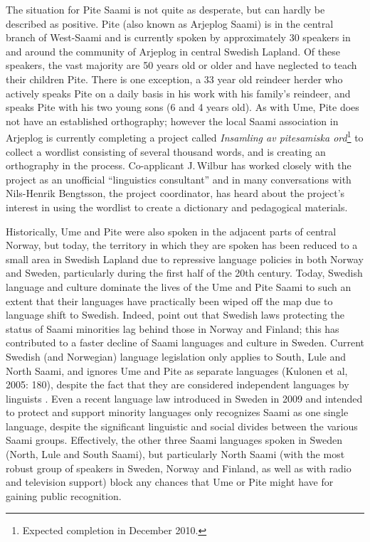 \documentclass[a4paper,12pt]{article}
\begin{document}
The situation for Pite Saami is not quite as desperate, but can hardly be described as positive. Pite (also known as Arjeplog Saami) is in the central branch of West-Saami and is currently spoken by approximately 30 speakers in and around the community of Arjeplog in central Swedish Lapland. Of these speakers, the vast majority are 50 years old or older and have neglected to teach their children Pite. There is one exception, a 33 year old reindeer herder who actively speaks Pite on a daily basis in his work with his family's reindeer, and speaks Pite with his two young sons (6 and 4 years old). As with Ume, Pite does not have an established orthography; however the local Saami association in Arjeplog is currently completing a project called \textit{Insamling av pitesamiska ord}\footnote{Expected completion in December 2010.} to collect a wordlist consisting of several thousand words, and is creating an orthography in the process. Co-applicant J.\,Wilbur has worked closely with the project as an unofficial “linguistics consultant” and in many conversations with Nils-Henrik Bengtsson, the project coordinator, has heard about the project's interest in using the wordlist to create a dictionary and pedagogical materials.

Historically, Ume and Pite were also spoken in the adjacent parts of central Norway, but today, the territory in which they are spoken has been reduced to a small area in Swedish Lapland due to repressive language policies in both Norway and Sweden, particularly during the first half of the 20th century. Today, Swedish language and culture dominate the lives of the Ume and Pite Saami to such an extent that their languages have practically been wiped off the map due to language shift to Swedish. Indeed, \citet[123]{blokland-etal2003} point out that Swedish laws protecting the status of Saami minorities lag behind those in Norway and Finland; this has contributed to a faster decline of Saami languages and culture in Sweden. Current Swedish (and Norwegian) language legislation only applies to South, Lule and North Saami, and ignores Ume and Pite as separate languages (Kulonen et al, 2005: 180), despite the fact that they are considered independent languages by linguists \citep[cf.][]{gordon 2005,sammallahti1998b}. Even a recent language law introduced in Sweden in 2009 and intended to protect and support minority languages only recognizes Saami as one single language, despite the significant linguistic and social divides between the various Saami groups. Effectively, the other three Saami languages spoken in Sweden (North, Lule and South Saami), but particularly North Saami (with the most robust group of speakers in Sweden, Norway and Finland, as well as with radio and television support) block any chances that Ume or Pite might have for gaining public recognition. 
\end{document}
